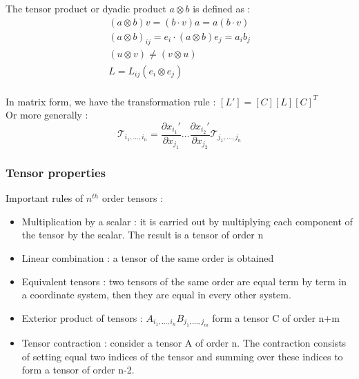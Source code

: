 \documentclass[../main.tex]{subfiles}
\begin{document}
The tensor product or dyadic product $a\otimes b$ is defined as : \begin{equation}
    \begin{gathered}
        (a\otimes b)v = (b\cdot v)a = a(b\cdot v)\\
        (a\otimes b)_{ij} = e_i \cdot (a\otimes b)e_j = a_ib_j\\
        (u\otimes v) \neq (v\otimes u)\\
        L = L_{ij}(e_i\otimes e_j)\\
    \end{gathered}
\end{equation}

In matrix form, we have the transformation rule : $[L'] = [C][L][C]^T$\\
Or more generally : \begin{equation}
\mathcal{T}_{i_1, \dots, i_n} = \frac{\partial x_{i_1}'}{\partial x_{j_1}} \dots \frac{\partial x_{i_2}'}{\partial x_{j_2}} \mathcal{T}_{j_1, \dots, j_n}
\end{equation}

\subsubsection{Tensor properties}

Important rules of $n^{th}$ order tensors : \begin{itemize}
    \item Multiplication by a scalar : it is carried out by multiplying each component of the tensor by the scalar. The result is a tensor of order n\\
    \item Linear combination : a tensor of the same order is obtained\\
    \item Equivalent tensors : two tensors of the same order are equal term by term in a coordinate system, then they are equal in every other system. \\
    \item Exterior product of tensors : $A_{i_1, \dots, i_n}B_{j_1, \dots, j_m}$ form a tensor C of order n+m\\
    \item Tensor contraction : consider a tensor A of order n. The contraction consists of setting equal two indices of the tensor and summing over these indices to form a tensor of order n-2.\\
\end{itemize}
\end{document}
